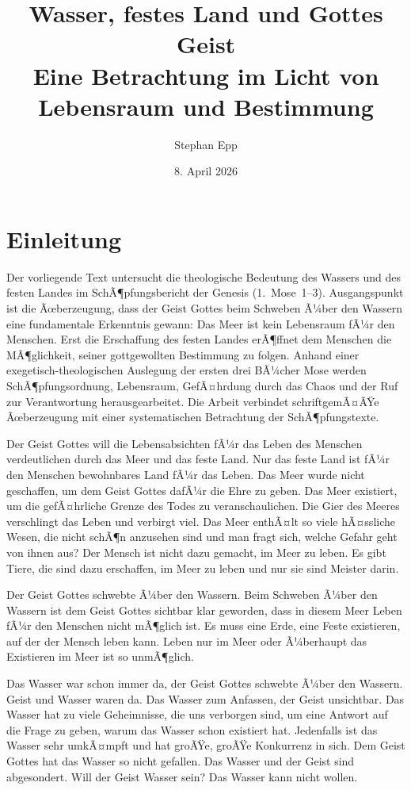 ﻿\documentclass[a4paper,12pt]{article}
\title{\textbf{Wasser, festes Land und Gottes Geist}\\[-0.1em]
	Eine Betrachtung im Licht von \\ Lebensraum und Bestimmung}
\author{Stephan Epp}
\date{8. April 2026}
\theoremstyle{definition}
\begin{document}
\maketitle
\tableofcontents
\newpage

\section{Einleitung}
        Der vorliegende Text untersucht die theologische Bedeutung des Wassers
und des festen Landes im SchÃ¶pfungsbericht der Genesis (1.~Mose~1--3).
Ausgangspunkt ist die Ãœberzeugung, dass der Geist Gottes beim Schweben
Ã¼ber den Wassern eine fundamentale Erkenntnis gewann: Das Meer ist kein
Lebensraum fÃ¼r den Menschen. Erst die Erschaffung des festen Landes
erÃ¶ffnet dem Menschen die MÃ¶glichkeit, seiner gottgewollten Bestimmung
zu folgen. Anhand einer exegetisch-theologischen Auslegung der ersten
drei BÃ¼cher Mose werden SchÃ¶pfungsordnung, Lebensraum, GefÃ¤hrdung durch
das Chaos und der Ruf zur Verantwortung herausgearbeitet. Die Arbeit
verbindet schriftgemÃ¤ÃŸe Ãœberzeugung mit einer systematischen Betrachtung
der SchÃ¶pfungstexte.

Der Geist Gottes will die Lebensabsichten fÃ¼r das Leben des Menschen verdeutlichen
durch das Meer und das feste Land. Nur das feste Land ist fÃ¼r den Menschen
bewohnbares Land fÃ¼r das Leben. Das Meer wurde nicht geschaffen, um dem Geist Gottes
dafÃ¼r die Ehre zu geben. Das Meer existiert, um die gefÃ¤hrliche Grenze des Todes
zu veranschaulichen. Die Gier des Meeres verschlingt das Leben und verbirgt viel.
Das Meer enthÃ¤lt so viele hÃ¤ssliche Wesen, die nicht schÃ¶n anzusehen sind und man
fragt sich, welche Gefahr geht von ihnen aus? Der Mensch ist nicht dazu gemacht,
im Meer zu leben. Es gibt Tiere, die sind dazu erschaffen, im Meer zu leben und
nur sie sind Meister darin.

Der Geist Gottes schwebte Ã¼ber den Wassern. Beim Schweben Ã¼ber den Wassern ist
dem Geist Gottes sichtbar klar geworden, dass in diesem Meer Leben fÃ¼r den Menschen
nicht mÃ¶glich ist. Es muss eine Erde, eine Feste existieren, auf der der Mensch
leben kann. Leben nur im Meer oder Ã¼berhaupt das Existieren im Meer ist so unmÃ¶glich.

Das Wasser war schon immer da, der Geist Gottes schwebte Ã¼ber den Wassern. Geist
und Wasser waren da. Das Wasser zum Anfassen, der Geist unsichtbar. Das Wasser
hat zu viele Geheimnisse, die uns verborgen sind, um eine Antwort auf die Frage
zu geben, warum das Wasser schon existiert hat. Jedenfalls ist das Wasser sehr
umkÃ¤mpft und hat groÃŸe, groÃŸe Konkurrenz in sich. Dem Geist Gottes hat das Wasser
so nicht gefallen. Das Wasser und der Geist sind abgesondert. Will der Geist Wasser
sein? Das Wasser kann nicht wollen.
\end{document}
